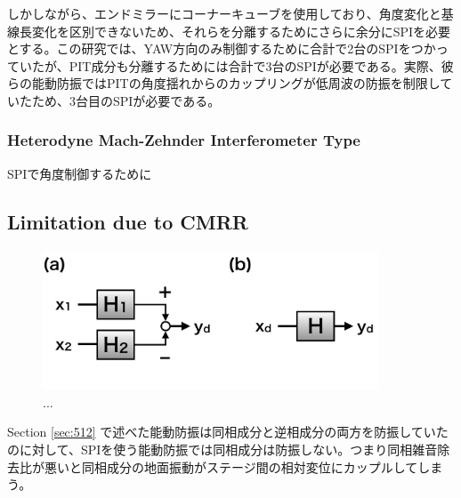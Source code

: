 しかしながら、エンドミラーにコーナーキューブを使用しており、角度変化と基線長変化を区別できないため、それらを分離するためにさらに余分にSPIを必要とする。この研究では、YAW方向のみ制御するために合計で2台のSPIをつかっていたが、PIT成分も分離するためには合計で3台のSPIが必要である。実際、彼らの能動防振ではPITの角度揺れからのカップリングが低周波の防振を制限していたため、3台目のSPIが必要である。

\subsubsection{Heterodyne Mach-Zehnder Interferometer Type}
SPIで角度制御するために


\cite{dahl2012suspension,sina2018towards}

\subsection{Limitation due to CMRR}\label{sec532}
\begin{figure}[h]
  \begin{center}   
    \includegraphics[width=10cm]{./img_chap5/img510.png}
    \caption{...} \label{img:img510}
  \end{center}
\end{figure}
Section \cref{sec:512} で述べた能動防振は同相成分と逆相成分の両方を防振していたのに対して、SPIを使う能動防振では同相成分は防振しない。つまり同相雑音除去比が悪いと同相成分の地面振動がステージ間の相対変位にカップルしてしまう。

